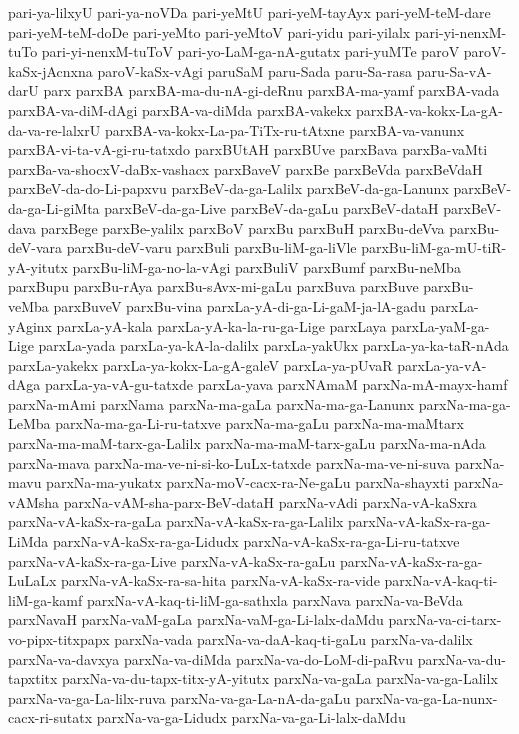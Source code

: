 {pari-ya-lilxyU
pari-ya-noVDa
pari-yeMtU
pari-yeM-tayAyx
pari-yeM-teM-dare
pari-yeM-teM-doDe
pari-yeMto
pari-yeMtoV
pari-yidu
pari-yilalx
pari-yi-nenxM-tuTo
pari-yi-nenxM-tuToV
pari-yo-LaM-ga-nA-gutatx
pari-yuMTe
paroV
paroV-kaSx-jAcnxna
paroV-kaSx-vAgi
paruSaM
paru-Sada
paru-Sa-rasa
paru-Sa-vA-darU
parx
parxBA
parxBA-ma-du-nA-gi-deRnu
parxBA-ma-yamf
parxBA-vada
parxBA-va-diM-dAgi
parxBA-va-diMda
parxBA-vakekx
parxBA-va-kokx-La-gA-da-va-re-lalxrU
parxBA-va-kokx-La-pa-TiTx-ru-tAtxne
parxBA-va-vanunx
parxBA-vi-ta-vA-gi-ru-tatxdo
parxBUtAH
parxBUve
parxBava
parxBa-vaMti
parxBa-va-shocxV-daBx-vashacx
parxBaveV
parxBe
parxBeVda
parxBeVdaH
parxBeV-da-do-Li-papxvu
parxBeV-da-ga-Lalilx
parxBeV-da-ga-Lanunx
parxBeV-da-ga-Li-giMta
parxBeV-da-ga-Live
parxBeV-da-gaLu
parxBeV-dataH
parxBeV-dava
parxBege
parxBe-yalilx
parxBoV
parxBu
parxBuH
parxBu-deVva
parxBu-deV-vara
parxBu-deV-varu
parxBuli
parxBu-liM-ga-liVle
parxBu-liM-ga-mU-tiR-yA-yitutx
parxBu-liM-ga-no-la-vAgi
parxBuliV
parxBumf
parxBu-neMba
parxBupu
parxBu-rAya
parxBu-sAvx-mi-gaLu
parxBuva
parxBuve
parxBu-veMba
parxBuveV
parxBu-vina
parxLa-yA-di-ga-Li-gaM-ja-lA-gadu
parxLa-yAginx
parxLa-yA-kala
parxLa-yA-ka-la-ru-ga-Lige
parxLaya
parxLa-yaM-ga-Lige
parxLa-yada
parxLa-ya-kA-la-dalilx
parxLa-yakUkx
parxLa-ya-ka-taR-nAda
parxLa-yakekx
parxLa-ya-kokx-La-gA-galeV
parxLa-ya-pUvaR
parxLa-ya-vA-dAga
parxLa-ya-vA-gu-tatxde
parxLa-yava
parxNAmaM
parxNa-mA-mayx-hamf
parxNa-mAmi
parxNama
parxNa-ma-gaLa
parxNa-ma-ga-Lanunx
parxNa-ma-ga-LeMba
parxNa-ma-ga-Li-ru-tatxve
parxNa-ma-gaLu
parxNa-ma-maMtarx
parxNa-ma-maM-tarx-ga-Lalilx
parxNa-ma-maM-tarx-gaLu
parxNa-ma-nAda
parxNa-mava
parxNa-ma-ve-ni-si-ko-LuLx-tatxde
parxNa-ma-ve-ni-suva
parxNa-mavu
parxNa-ma-yukatx
parxNa-moV-cacx-ra-Ne-gaLu
parxNa-shayxti
parxNa-vAMsha
parxNa-vAM-sha-parx-BeV-dataH
parxNa-vAdi
parxNa-vA-kaSxra
parxNa-vA-kaSx-ra-gaLa
parxNa-vA-kaSx-ra-ga-Lalilx
parxNa-vA-kaSx-ra-ga-LiMda
parxNa-vA-kaSx-ra-ga-Lidudx
parxNa-vA-kaSx-ra-ga-Li-ru-tatxve
parxNa-vA-kaSx-ra-ga-Live
parxNa-vA-kaSx-ra-gaLu
parxNa-vA-kaSx-ra-ga-LuLaLx
parxNa-vA-kaSx-ra-sa-hita
parxNa-vA-kaSx-ra-vide
parxNa-vA-kaq-ti-liM-ga-kamf
parxNa-vA-kaq-ti-liM-ga-sathxla
parxNava
parxNa-va-BeVda
parxNavaH
parxNa-vaM-gaLa
parxNa-vaM-ga-Li-lalx-daMdu
parxNa-va-ci-tarx-vo-pipx-titxpapx
parxNa-vada
parxNa-va-daA-kaq-ti-gaLu
parxNa-va-dalilx
parxNa-va-davxya
parxNa-va-diMda
parxNa-va-do-LoM-di-paRvu
parxNa-va-du-tapxtitx
parxNa-va-du-tapx-titx-yA-yitutx
parxNa-va-gaLa
parxNa-va-ga-Lalilx
parxNa-va-ga-La-lilx-ruva
parxNa-va-ga-La-nA-da-gaLu
parxNa-va-ga-La-nunx-cacx-ri-sutatx
parxNa-va-ga-Lidudx
parxNa-va-ga-Li-lalx-daMdu
}
